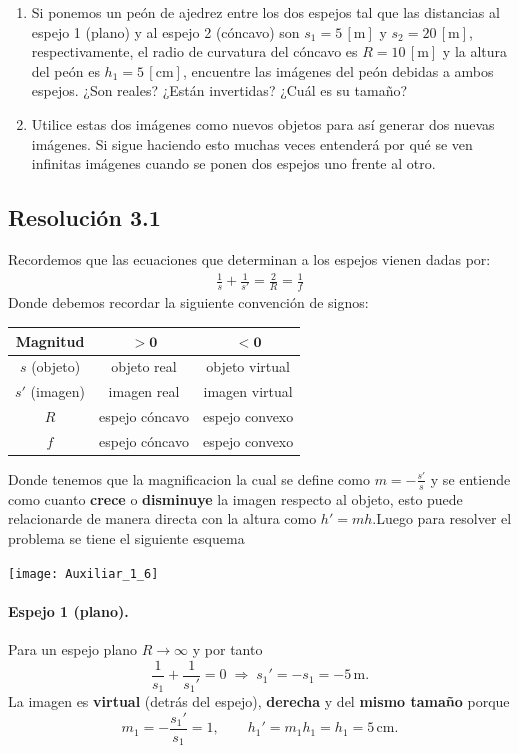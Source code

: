 \documentclass[
  11pt,
  letterpaper,
   addpoints,
   answers
  ]{exam}
\begin{document}
\begin{questions}
\begin{enumerate}
    \item Si ponemos un peón de ajedrez entre los dos espejos tal que las distancias al espejo 1 (plano) y al espejo 2 (cóncavo) son $s_1=5\,[\mathrm{m}]$ y $s_2=20\,[\mathrm{m}]$, respectivamente, el radio de curvatura del cóncavo es $R=10\,[\mathrm{m}]$ y la altura del peón es $h_1=5\,[\mathrm{cm}]$, encuentre las imágenes del peón debidas a ambos espejos. ¿Son reales? ¿Están invertidas? ¿Cuál es su tamaño?
    \item Utilice estas dos imágenes como nuevos objetos para así generar dos nuevas imágenes. Si sigue haciendo esto muchas veces entenderá por qué se ven infinitas imágenes cuando se ponen dos espejos uno frente al otro.
\end{enumerate}

\begin{solution}
\subsection*{Resolución 3.1}
Recordemos que las ecuaciones que determinan a los espejos vienen dadas por:
\begin{align}
    \frac{1}{s}+\frac{1}{s'}=\frac{2}{R}=\frac{1}{f}
\end{align}
Donde debemos recordar la siguiente convención de signos:
\begin{center}
\begin{tabular}{c|c|c}
	\textbf{Magnitud} & $\boldsymbol{>0}$ & $\boldsymbol{<0}$ \\
\hline
$s$ (objeto) & objeto real & objeto virtual \\
$s'$ (imagen) & imagen real & imagen virtual \\
$R$ & espejo cóncavo & espejo convexo \\
$f$ & espejo cóncavo & espejo convexo \\
\end{tabular}
\end{center}
Donde tenemos que la magnificacion la cual se define como $m=-\frac{s'}{s}$ y se entiende como cuanto \textbf{crece} o \textbf{disminuye} la imagen respecto al objeto, esto puede relacionarde de manera directa con la altura como $h' = mh$.Luego para resolver el problema se tiene el siguiente esquema 
\begin{center}
\texttt{[image: Auxiliar\_1\_6]}
\end{center}
\paragraph{Espejo 1 (plano).} Para un espejo plano $R\to\infty$ y por tanto
\[
\frac{1}{s_1}+\frac{1}{s_1'}=0\;\Rightarrow\; s_1'=-s_1=-5\,\text{m}.
\]
La imagen es \textbf{virtual} (detrás del espejo), \textbf{derecha} y del \textbf{mismo tamaño} porque
\[
m_1=-\frac{s_1'}{s_1}=1,\qquad h_1'=m_1h_1=h_1=5\,\text{cm}.
\]


\end{solution}
\end{questions}
\end{document}
